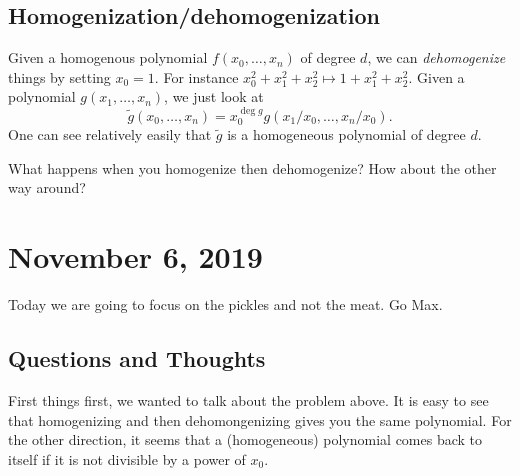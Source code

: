 \documentclass[12pt]{article}
\begin{document}
\subsection{Homogenization/dehomogenization}
Given a homogenous polynomial $f(x_0,\dots,x_n)$ of degree $d$, we can \textit{dehomogenize} things by setting $x_0=1$. For instance $x_0^2+x_1^2+x_2^2\mapsto 1+x_1^2+x_2^2$.
Given a polynomial $g(x_1,\dots,x_n)$, we just look at 
\[\tilde g(x_0,\dots,x_n)=x_0^{\deg g}g(x_1/x_0,\dots,x_n/x_0).\]
One can see relatively easily that $\tilde g$ is a homogeneous polynomial of degree $d$.

\begin{prob}
	What happens when you homogenize then dehomogenize? How about the other way around?
\end{prob}

\section{November 6, 2019}
Today we are going to focus on the pickles and not the meat. Go Max.

\subsection{Questions and Thoughts}
First things first, we wanted to talk about the problem above. It is easy to see that homogenizing and then dehomongenizing gives you the same polynomial.
For the other direction, it seems that a (homogeneous) polynomial comes back to itself if it is not divisible by a power of $x_0$.
\end{document}
